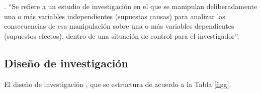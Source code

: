 \documentclass[12pt,a4paper]{article}
\begin{document}
\cite{hernandez_sampieri_metodologiinvestigacion_2014}. ``Se refiere a un estudio de investigación en
el que se manipulan deliberadamente una o más variables independientes
(supuestas causas)
para analizar las consecuencias de esa manipulación sobre una o más
variables dependientes
(supuestos efectos), dentro de una situación de control para el investigador''.




\subsection{Diseño de investigación}
El diseño de investigación \MakeTextLowercase{\diseno}, que se estructura de acuerdo a la Tabla \ref{figg}.
\end{document}
